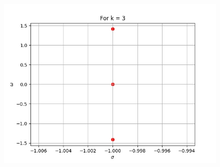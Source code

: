\documentclass{beamer}
\begin{document}
\begin{frame}
\begin{figure}
\includegraphics[scale = 0.6]{k=3.jpg}
\end{figure}
\end{frame}
\end{document}
